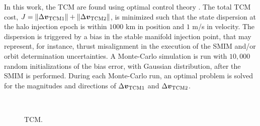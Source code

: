 In this work, the {TCM} are found using optimal control theory \cite{serban2002haloTCM}. The total {TCM} cost, $J = \|\Delta\boldsymbol{v}_{\textrm{TCM1}}\|+\|\Delta\boldsymbol{v}_{\textrm{TCM2}}\|$, is minimized such that the state dispersion at the halo injection epoch is within $1000$ km in position and $1$ m/s in velocity. The dispersion is triggered by a bias in the stable manifold injection point, that may represent, for instance, thrust misalignment in the execution of the {SMIM} and/or orbit determination uncertainties. A Monte-Carlo simulation is run with $10,000$ random initializations of the bias error, with Gaussian distribution, after the {SMIM} is performed. During each Monte-Carlo run, an optimal problem is solved for the magnitudes and directions of $\Delta\boldsymbol{v}_{\textrm{TCM1}}$ and $\Delta\boldsymbol{v}_{\textrm{TCM2}}$.
%
\begin{figure*}[b!]
	\centering
	\hfill
	\hfill
	\hfill
	\hfill
	\hfill \\
	\hfill
	\hfill
	\hfill
	\caption[Trajectory correction maneuvers.]{{TCM}.}
	\label{fig:TCMsData}
\end{figure*}
%

